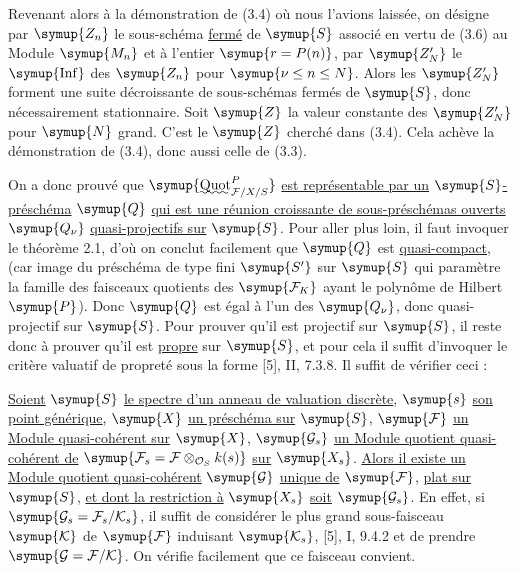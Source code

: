 Revenant alors à la démonstration de (3.4) où nous l'avions laissée, on désigne
par $\symup{Z_n}$ le sous-schéma \uline{fermé} de $\symup{S}$ associé en vertu de (3.6) au Module $\symup{M_n}$
et à l'entier $\symup{r=P(n)}$, par $\symup{Z'_N}$ le $\symup{\operatorname{Inf}}$ des $\symup{Z_n}$ pour
$\symup{\nu\leq n\leq N}$. Alors les $\symup{Z'_N}$ forment une suite décroissante de
sous-schémas fermés de $\symup{S}$, donc nécessairement stationnaire. Soit $\symup{Z}$ la
valeur constante des $\symup{Z'_N}$ pour $\symup{N}$ grand. C'est le $\symup{Z}$ cherché dans (3.4).
Cela achève la démonstration de (3.4), donc aussi celle de (3.3).

On a donc prouvé que
$\symup{\mathop{\text{\uwave{Quot}}}\nolimits^P_{\mathcal F/X/S}}$ \uline{est représentable par un}
$\symup{S}$\uline{-préschéma} $\symup{Q}$ \uline{qui est une réunion croissante de sous-préschémas ouverts}
$\symup{Q_\nu}$ \uline{quasi-projectifs sur} $\symup{S}$. Pour aller plus loin, il faut invoquer le
théorème 2.1, d'où on conclut facilement que $\symup{Q}$ est \uline{quasi-compact}, (car image du
préschéma de type fini $\symup{S'}$ sur $\symup{S}$ qui paramètre la famille des faisceaux
quotients des $\symup{\mathcal F_K}$ ayant le polynôme de Hilbert $\symup{P}$). Donc $\symup{Q}$ est
égal à l'un des $\symup{Q_\nu}$, donc quasi-projectif sur $\symup{S}$. Pour prouver qu'il est
projectif sur $\symup{S}$, il reste donc à prouver qu'il est \uline{propre} sur $\symup{S}$, et pour
cela il suffit d'invoquer le critère valuatif de propreté sous la forme [5],
II, 7.3.8. Il suffit de vérifier ceci :

 \uline{Soient} $\symup{S}$ \uline{le spectre d'un anneau de valuation discrète},
$\symup{s}$ \uline{son point générique}, $\symup{X}$ \uline{un préschéma sur} $\symup{S}$, $\symup{\mathcal F}$ \uline{un Module
quasi-cohérent sur} $\symup{X}$, $\symup{\mathcal G_s}$ \uline{un Module quotient quasi-cohérent de}
$\symup{\mathcal F_s=\mathcal F\otimes_{\mathcal O_S}k(s)}$ \uline{sur} $\symup{X_s}$. \uline{Alors il existe
un Module quotient quasi-cohérent} $\symup{\mathcal G}$ \uline{unique de} $\symup{\mathcal F}$, \uline{plat sur}
$\symup{S}$, \uline{et dont la restriction à} $\symup{X_s}$ \uline{soit} $\symup{\mathcal G_s}$.
En effet, si $\symup{\mathcal G_s=\mathcal F_s/\mathcal K_s}$, il suffit de considérer
le plus grand sous-faisceau $\symup{\mathcal K}$ de $\symup{\mathcal F}$ induisant
$\symup{\mathcal K_s}$, [5], I, 9.4.2 et de prendre
$\symup{\mathcal G=\mathcal F/\mathcal K}$. On vérifie facilement que ce faisceau
convient.

